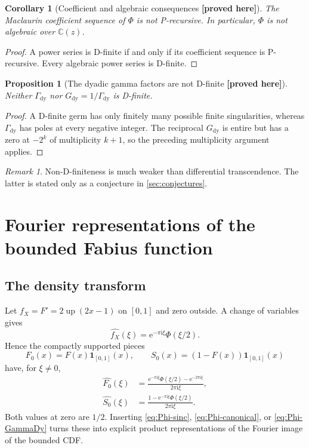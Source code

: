 \documentclass[11pt,oneside]{article}
\newtheorem{proposition}[theorem]{Proposition}
\newtheorem{corollary}[theorem]{Corollary}
\theoremstyle{definition}
\theoremstyle{remark}
\newtheorem{remark}[theorem]{Remark}
\newcommand{\C}{\mathbb C}
\newcommand{\Up}{\operatorname{up}}
\newcommand{\e}{\mathrm e}
\newcommand{\ii}{\mathrm i}
\newcommand{\GammaDy}{\Gamma_{\!\mathrm{dy}}}
\newcommand{\New}{\textcolor{amber}{\textbf{[proved here]}}}
\begin{document}
\begin{corollary}[Coefficient and algebraic consequences \New]
The Maclaurin coefficient sequence of $\Phi$ is not P-recursive.  In particular, $\Phi$ is
not algebraic over $\C(z)$.
\end{corollary}

\begin{proof}
A power series is D-finite if and only if its coefficient sequence is P-recursive.  Every
algebraic power series is D-finite.
\end{proof}

\begin{proposition}[The dyadic gamma factors are not D-finite \New]
Neither $\GammaDy$ nor $G_{\mathrm{dy}}=1/\GammaDy$ is D-finite.
\end{proposition}

\begin{proof}
A D-finite germ has only finitely many possible finite singularities, whereas $\GammaDy$ has
poles at every negative integer.  The reciprocal $G_{\mathrm{dy}}$ is entire but has a zero
at $-2^k$ of multiplicity $k+1$, so the preceding multiplicity argument applies.
\end{proof}

\begin{remark}
Non-D-finiteness is much weaker than differential transcendence.  The latter is stated only
as a conjecture in \cref{sec:conjectures}.
\end{remark}

\section{Fourier representations of the bounded Fabius function}
\label{sec:F-Fourier}

\subsection{The density transform}

Let $f_X=F'=2\Up(2x-1)$ on $[0,1]$ and zero outside.  A change of variables gives
\begin{equation}
 \boxed{\quad
 \widehat{f_X}(\xi)=\e^{-\pi\ii\xi}\Phi(\xi/2).
 \quad}                                                  \label{eq:fX-transform}
\end{equation}
Hence the compactly supported pieces
\begin{equation}
 F_0(x)=F(x)\mathbf1_{[0,1]}(x),
 \qquad
 S_0(x)=(1-F(x))\mathbf1_{[0,1]}(x)                      \label{eq:F0S0}
\end{equation}
have, for $\xi\ne0$,
\begin{align}
 \widehat{F_0}(\xi)
 &=\frac{\e^{-\pi\ii\xi}\Phi(\xi/2)-\e^{-2\pi\ii\xi}}
 {2\pi\ii\xi},                                         \label{eq:F0-transform}\\
 \widehat{S_0}(\xi)
 &=\frac{1-\e^{-\pi\ii\xi}\Phi(\xi/2)}{2\pi\ii\xi}.\label{eq:S0-transform}
\end{align}
Both values at zero are $1/2$.  Inserting \eqref{eq:Phi-sinc},
\eqref{eq:Phi-canonical}, or \eqref{eq:Phi-GammaDy} turns these into explicit product
representations of the Fourier image of the bounded CDF.
\end{document}
